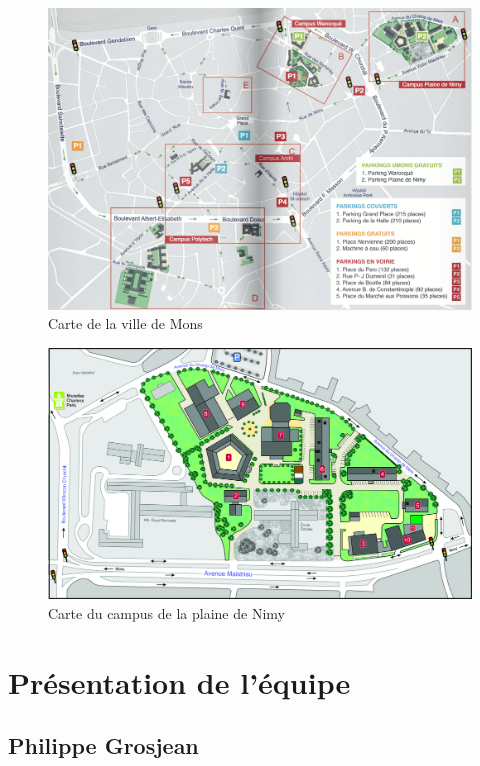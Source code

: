 \documentclass[]{report}
\begin{document}
\begin{figure}
\centering
\includegraphics{../image/plan-campus.png}
\caption{Carte de la ville de Mons}
\end{figure}

\begin{figure}
\centering
\includegraphics{../image/plaine-Nimy.jpg}
\caption{Carte du campus de la plaine de Nimy}
\end{figure}

\chapter{Présentation de l'équipe}\label{presentation-de-lequipe}

\section{Philippe Grosjean}\label{philippe-grosjean}
\end{document}
